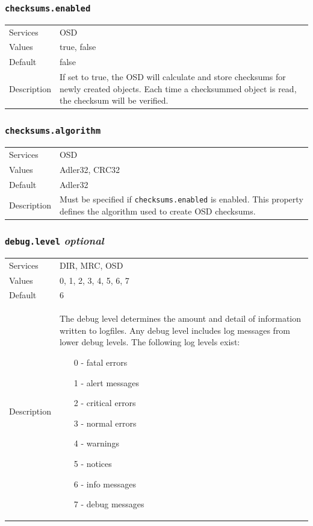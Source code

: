 \documentclass[a4paper,10pt]{book}
\begin{document}
\subsubsection{\texttt{checksums.enabled}}
\begin{tabular}{lp{10cm}}
 Services & OSD\\
 Values   & true, false \\
 Default  & false \\
 Description & If set to true, the OSD will calculate and store checksums for newly created objects. Each time a checksummed object is read, the checksum will be verified.
\end{tabular}

\subsubsection{\texttt{checksums.algorithm}}
\begin{tabular}{lp{10cm}}
 Services & OSD\\
 Values   & Adler32, CRC32 \\
 Default  & Adler32 \\
 Description & Must be specified if \texttt{checksums.enabled} is enabled. This property defines the algorithm used to create OSD checksums.
\end{tabular}

\subsubsection{\texttt{debug.level} \textit{optional}}
\begin{tabular}{lp{10cm}}
 Services & DIR, MRC, OSD\\
 Values   & 0, 1, 2, 3, 4, 5, 6, 7 \\
 Default  & 6 \\
 Description & The debug level determines the amount and detail of information written to logfiles. Any debug level includes log messages from lower debug levels. The following log levels exist:
\begin{enumerate}
 \item[0 -] fatal errors
 \item[1 -] alert messages
 \item[2 -] critical errors
 \item[3 -] normal errors
 \item[4 -] warnings
 \item[5 -] notices
 \item[6 -] info messages
 \item[7 -] debug messages
\end{enumerate}
\end{tabular}
\end{document}
